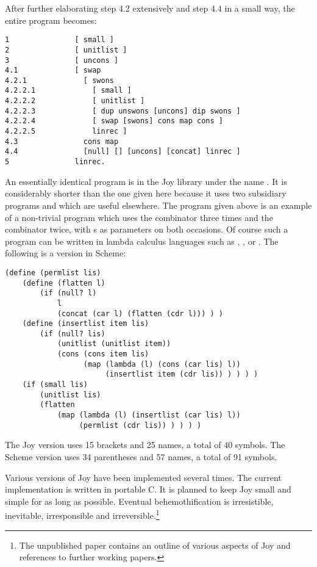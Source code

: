 After further elaborating step 4.2 extensively
and step 4.4 in a small way,
the entire program becomes:
\begin{verbatim}
1               [ small ]
2               [ unitlist ]
3               [ uncons ]
4.1             [ swap
4.2.1             [ swons
4.2.2.1             [ small ]
4.2.2.2             [ unitlist ]
4.2.2.3             [ dup unswons [uncons] dip swons ]
4.2.2.4             [ swap [swons] cons map cons ]
4.2.2.5             linrec ]
4.3               cons map
4.4               [null] [] [uncons] [concat] linrec ]
5               linrec.
\end{verbatim}
\par
An essentially identical program is in the Joy library
under the name .
It is considerably shorter than the one given here
because it uses two subsidiary programs 
and  which are useful elsewhere.
The program given above is an example
of a non-trivial program which uses
the  combinator three times
and the  combinator twice,
with s as parameters
on both occasions.
Of course such a program can be written
in lambda calculus languages such
as , ,  or .
The following is a version in Scheme:
\begin{verbatim}
(define (permlist lis)
    (define (flatten l)
        (if (null? l)
            l
            (concat (car l) (flatten (cdr l))) ) )
    (define (insertlist item lis)
        (if (null? lis)
            (unitlist (unitlist item))
            (cons (cons item lis)
                  (map (lambda (l) (cons (car lis) l))
                       (insertlist item (cdr lis)) ) ) ) )
    (if (small lis)
        (unitlist lis)
        (flatten
            (map (lambda (l) (insertlist (car lis) l))
                 (permlist (cdr lis)) ) ) ) )
\end{verbatim}
The Joy version uses 15 brackets and 25 names,
a total of 40 symbols.
The Scheme version uses 34 parentheses and 57 names,
a total of 91 symbols.
\par
Various versions of Joy have been implemented several times.
The current implementation is written in portable C.
It is planned to keep Joy small and simple for as long as possible.
Eventual behemothification is
irresistible, inevitable, irresponsible and irreversible.\footnote{
The unpublished paper
contains an outline of various aspects of Joy
and references to further working papers.
}
\newpage
%


%
\begin{theindex}

\end{theindex}
%

